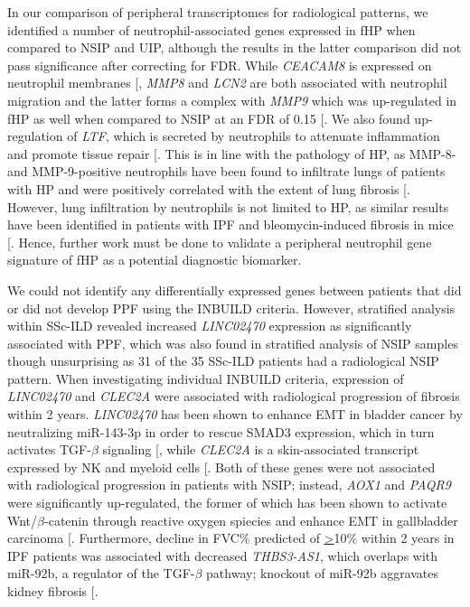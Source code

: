 \documentclass[
]{article}
\begin{document}
In our comparison of peripheral transcriptomes for radiological patterns, we identified a number of neutrophil-associated genes expressed in fHP when compared to NSIP and UIP, although the results in the latter comparison did not pass significance after correcting for FDR. While \textit{CEACAM8} is expressed on neutrophil membranes {[}\citeproc{ref-skubitz_interdependency_2008}{127}{]}, \textit{MMP8} and \textit{LCN2} are both associated with neutrophil migration and the latter forms a complex with \textit{MMP9} which was up-regulated in fHP as well when compared to NSIP at an FDR of 0.15 {[}\citeproc{ref-guardado_comprehensive_2021}{129}{]}. We also found up-regulation of \textit{LTF}, which is secreted by neutrophils to attenuate inflammation and promote tissue repair {[}\citeproc{ref-kruzel_lactoferrin_2017}{130}{]}. This is in line with the pathology of HP, as MMP-8- and MMP-9-positive neutrophils have been found to infiltrate lungs of patients with HP and were positively correlated with the extent of lung fibrosis {[}\citeproc{ref-pardo_increase_2000}{131}{]}. However, lung infiltration by neutrophils is not limited to HP, as similar results have been identified in patients with IPF and bleomycin-induced fibrosis in mice {[}\citeproc{ref-warheit-niemi_fibrotic_2022}{133}{]}. Hence, further work must be done to validate a peripheral neutrophil gene signature of fHP as a potential diagnostic biomarker.

We could not identify any differentially expressed genes between patients that did or did not develop PPF using the INBUILD criteria. However, stratified analysis within SSc-ILD revealed increased \textit{LINC02470} expression as significantly associated with PPF, which was also found in stratified analysis of NSIP samples though unsurprising as 31 of the 35 SSc-ILD patients had a radiological NSIP pattern. When investigating individual INBUILD criteria, expression of \textit{LINC02470} and \textit{CLEC2A} were associated with radiological progression of fibrosis within 2 years. \textit{LINC02470} has been shown to enhance EMT in bladder cancer by neutralizing miR-143-3p in order to rescue SMAD3 expression, which in turn activates TGF-\(\beta\) signaling {[}\citeproc{ref-huang_long_2022}{134}{]}, while \textit{CLEC2A} is a skin-associated transcript expressed by NK and myeloid cells {[}\citeproc{ref-spreu_clec2a_2007}{135}{]}. Both of these genes were not associated with radiological progression in patients with NSIP; instead, \textit{AOX1} and \textit{PAQR9} were significantly up-regulated, the former of which has been shown to activate Wnt/\(\beta\)-catenin through reactive oxygen spiecies and enhance EMT in gallbladder carcinoma {[}\citeproc{ref-yuan_aldehyde_2024}{136}{]}. Furthermore, decline in FVC\% predicted of \underline{>}10\% within 2 years in IPF patients was associated with decreased \textit{THBS3-AS1}, which overlaps with miR-92b, a regulator of the TGF-\(\beta\) pathway; knockout of miR-92b aggravates kidney fibrosis {[}\citeproc{ref-yang_mircrorna-92b_2023}{137}{]}.
\end{document}
